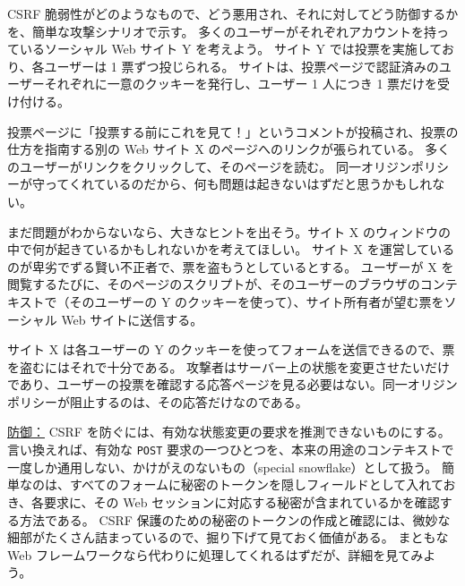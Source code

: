 \documentclass[uplatex]{jsarticle}
\def\label#1{}%
\begin{document}
\begin{exa}\label{exa:ch11-csrf-voting}
CSRF 脆弱性がどのようなもので、どう悪用され、それに対してどう防御するかを、簡単な攻撃シナリオで示す。
多くのユーザーがそれぞれアカウントを持っているソーシャル Web サイト Y を考えよう。
サイト Y では投票を実施しており、各ユーザーは 1 票ずつ投じられる。
サイトは、投票ページで認証済みのユーザーそれぞれに一意のクッキーを発行し、ユーザー 1 人につき 1 票だけを受け付ける。

投票ページに「投票する前にこれを見て！」というコメントが投稿され、投票の仕方を指南する別の Web サイト X のページへのリンクが張られている。
多くのユーザーがリンクをクリックして、そのページを読む。
同一オリジンポリシーが守ってくれているのだから、何も問題は起きないはずだと思うかもしれない。

まだ問題がわからないなら、大きなヒントを出そう。サイト X のウィンドウの中で何が起きているかもしれないかを考えてほしい。
サイト X を運営しているのが卑劣でずる賢い不正者で、票を盗もうとしているとする。
ユーザーが X を閲覧するたびに、そのページのスクリプトが、そのユーザーのブラウザのコンテキストで（そのユーザーの Y のクッキーを使って）、サイト所有者が望む票をソーシャル Web サイトに送信する。

サイト X は各ユーザーの Y のクッキーを使ってフォームを送信できるので、票を盗むにはそれで十分である。
攻撃者はサーバー上の状態を変更させたいだけであり、ユーザーの投票を確認する応答ページを見る必要はない。同一オリジンポリシーが阻止するのは、その応答だけなのである。
\end{exa}

\underline{防御：}
CSRF を防ぐには、有効な状態変更の要求を推測できないものにする。
言い換えれば、有効な \texttt{POST} 要求の一つひとつを、本来の用途のコンテキストで一度しか通用しない、かけがえのないもの（special snowflake）として扱う。
簡単なのは、すべてのフォームに秘密のトークンを隠しフィールドとして入れておき、各要求に、その Web セッションに対応する秘密が含まれているかを確認する方法である。
CSRF 保護のための秘密のトークンの作成と確認には、微妙な細部がたくさん詰まっているので、掘り下げて見ておく価値がある。
まともな Web フレームワークなら代わりに処理してくれるはずだが、詳細を見てみよう。
\end{document}
